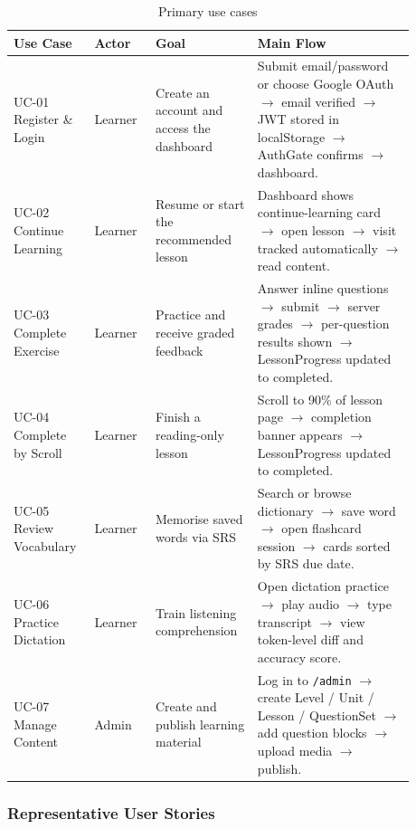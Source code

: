 \begin{longtable}{p{0.16\linewidth} p{0.14\linewidth} p{0.22\linewidth} p{0.36\linewidth}}
\caption{Primary use cases}\\
\toprule
Use Case & Actor & Goal & Main Flow \\
\midrule
\endhead
UC-01 Register \& Login & Learner & Create an account and access the dashboard & Submit email/password or choose Google OAuth $\rightarrow$ email verified $\rightarrow$ JWT stored in localStorage $\rightarrow$ AuthGate confirms $\rightarrow$ dashboard. \\
UC-02 Continue Learning & Learner & Resume or start the recommended lesson & Dashboard shows continue-learning card $\rightarrow$ open lesson $\rightarrow$ visit tracked automatically $\rightarrow$ read content. \\
UC-03 Complete Exercise & Learner & Practice and receive graded feedback & Answer inline questions $\rightarrow$ submit $\rightarrow$ server grades $\rightarrow$ per-question results shown $\rightarrow$ LessonProgress updated to completed. \\
UC-04 Complete by Scroll & Learner & Finish a reading-only lesson & Scroll to 90\% of lesson page $\rightarrow$ completion banner appears $\rightarrow$ LessonProgress updated to completed. \\
UC-05 Review Vocabulary & Learner & Memorise saved words via SRS & Search or browse dictionary $\rightarrow$ save word $\rightarrow$ open flashcard session $\rightarrow$ cards sorted by SRS due date. \\
UC-06 Practice Dictation & Learner & Train listening comprehension & Open dictation practice $\rightarrow$ play audio $\rightarrow$ type transcript $\rightarrow$ view token-level diff and accuracy score. \\
UC-07 Manage Content & Admin & Create and publish learning material & Log in to \texttt{/admin} $\rightarrow$ create Level / Unit / Lesson / QuestionSet $\rightarrow$ add question blocks $\rightarrow$ upload media $\rightarrow$ publish. \\
\bottomrule
\end{longtable}

\subsubsection{Representative User Stories}

